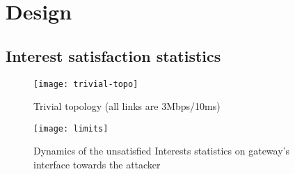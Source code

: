 \section{Design}
\label{sec:design}

\subsection{Interest satisfaction statistics}

\begin{figure}[htbp]
  \centering
  \texttt{[image: trivial-topo]}
  \caption{Trivial topology (all links are 3Mbps/10ms)}
  \label{fig:trivial topology}
\end{figure}


\begin{figure}[htbp]
  \centering
  \texttt{[image: limits]}
  \caption{Dynamics of the unsatisfied Interests statistics on gateway's interface towards the attacker}
  \label{fig:ratio example}
\end{figure}


